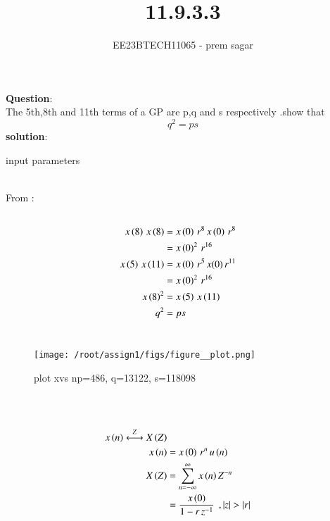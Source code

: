 \documentclass[journal,12pt,twocolumn]{IEEEtran}
\theoremstyle{remark}
\begin{document}

\vspace{3cm}

\title{11.9.3.3}
\author{EE23BTECH11065 - prem sagar}
\maketitle
\newpage

\bigskip 

\renewcommand{\thefigure}{\theenumi}
\renewcommand{\thetable}{\theenumi}
\textbf{Question}:\\ The 5th,8th and 11th terms of a GP are p,q and s respectively .show that \[q^2=ps\]
\textbf{solution}:
\\\begin{table}[!ht]
   \centering
    \renewcommand\thetable{1}
      
    \caption{input parameters}
    \label{tab:table_11.9.3}
 \end{table}
\\ From :
\begin{align}
\\x\left(8\right)\,x\left(8\right)&=x\left(0\right)\,r^8\,x\left(0\right)\,r^8
     \\ &=x\left(0\right)^2\,r^{16}
\\x\left(5\right)\,x\left({11}\right)&=x\left(0\right)\,r^5\,x(0)\,r^{11}
       \\&=x\left(0\right)^2\,r^{16}
\\x\left(8\right)^2&=x\left(5\right)\,x\left({11}\right)
\\q^2&=ps
\end{align}   
\\\begin{figure}[h]
   \renewcommand\thefigure{1}
    \centering
    \texttt{[image: /root/assign1/figs/figure\_\_plot.png]}
    \caption{plot xvs n\hspace{0.1cm}p=486,
    \hspace{0.1cm}q=13122,
    \hspace{0.1cm}s=118098}
    \label{fig:1}
\end{figure}\\
\\\begin{align}
x\brak{n}\overset{Z}{\longleftrightarrow}   X\brak{Z}
\\x\brak{n}&=x\brak{0}\,r^n\,u\brak{n}
\\X\brak{Z}&=\sum_{n=-\infty}^{\infty}x\brak{n} Z^{-n}\
     \\ &= \frac{x\brak{0}}{1-r\,z^{-1}}\: \:,|z|>|r|
     \end{align}
\end{document}
